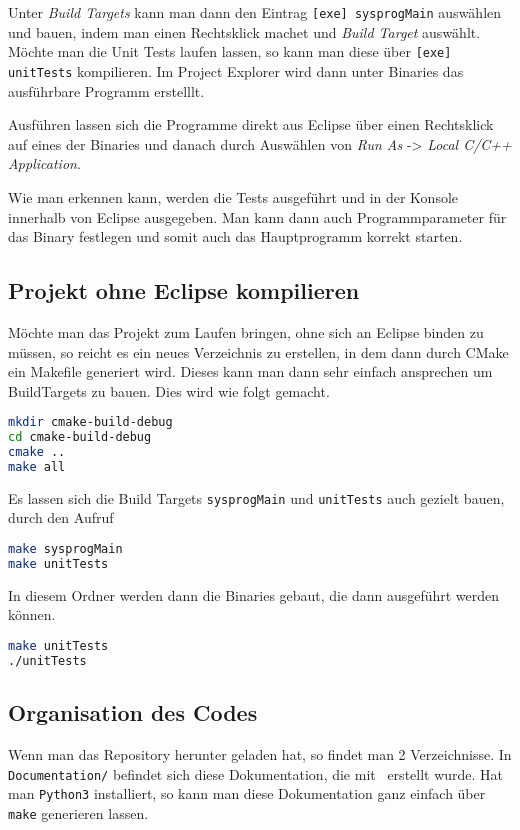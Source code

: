Unter \textit{Build Targets} kann man dann den Eintrag \texttt{[exe] sysprogMain} auswählen und bauen, indem man einen Rechtsklick machet und \textit{Build Target} auswählt. Möchte man die Unit Tests laufen lassen, so kann man diese über \texttt{[exe] unitTests} kompilieren. Im Project Explorer wird dann unter Binaries das ausführbare Programm erstelllt.


Ausführen lassen sich die Programme direkt aus Eclipse über einen Rechtsklick auf eines der Binaries und danach durch Auswählen von \textit{Run As} -> \textit{Local C/C++ Application}.

Wie man erkennen kann, werden die Tests ausgeführt und in der Konsole innerhalb von Eclipse ausgegeben. Man kann dann auch Programmparameter für das Binary festlegen und somit auch das Hauptprogramm korrekt starten.

\subsection{Projekt ohne Eclipse kompilieren}
Möchte man das Projekt zum Laufen bringen, ohne sich an Eclipse binden zu müssen, so reicht es ein neues Verzeichnis zu erstellen, in dem dann durch CMake ein Makefile generiert wird. Dieses kann man dann sehr einfach ansprechen um BuildTargets zu bauen. Dies wird wie folgt gemacht.

\begin{lstlisting}[language=bash,numbers=none]
mkdir cmake-build-debug
cd cmake-build-debug
cmake ..
make all
\end{lstlisting}

Es lassen sich die Build Targets \texttt{sysprogMain} und \texttt{unitTests} auch gezielt bauen, durch den Aufruf

\begin{lstlisting}[language=bash,numbers=none]
make sysprogMain
make unitTests
\end{lstlisting}

In diesem Ordner werden dann die Binaries gebaut, die dann ausgeführt werden können.
\begin{lstlisting}[language=bash,numbers=none]
make unitTests
./unitTests
\end{lstlisting}

\subsection{Organisation des Codes}\label{sec:orga_code}
Wenn man das Repository herunter geladen hat, so findet man 2 Verzeichnisse. In \texttt{Documentation/} befindet sich diese Dokumentation, die mit \XeLaTeX\ erstellt wurde. Hat man \texttt{Python3} installiert, so kann man diese Dokumentation ganz einfach über \texttt{make} generieren lassen.


